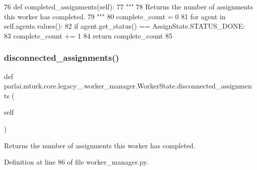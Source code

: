 \begin{DoxyCode}
76     \textcolor{keyword}{def }completed\_assignments(self):
77         \textcolor{stringliteral}{"""}
78 \textcolor{stringliteral}{        Returns the number of assignments this worker has completed.}
79 \textcolor{stringliteral}{        """}
80         complete\_count = 0
81         \textcolor{keywordflow}{for} agent \textcolor{keywordflow}{in} self.agents.values():
82             \textcolor{keywordflow}{if} agent.get\_status() == AssignState.STATUS\_DONE:
83                 complete\_count += 1
84         \textcolor{keywordflow}{return} complete\_count
85 
\end{DoxyCode}
\mbox{\label{classparlai_1_1mturk_1_1core_1_1legacy__2018_1_1worker__manager_1_1WorkerState_a71b6e7fc9890824b62fc968e3c7559ce}} 
\subsubsection{\texorpdfstring{disconnected\+\_\+assignments()}{disconnected\_assignments()}}
{\footnotesize\ttfamily def parlai.\+mturk.\+core.\+legacy\+\_.\+worker\+\_\+manager.\+Worker\+State.\+disconnected\+\_\+assignments (\begin{DoxyParamCaption}\item[{}]{self }\end{DoxyParamCaption})}

\begin{DoxyVerb}Returns the number of assignments this worker has completed.
\end{DoxyVerb}
 

Definition at line 86 of file worker\+\_\+manager.\+py.


